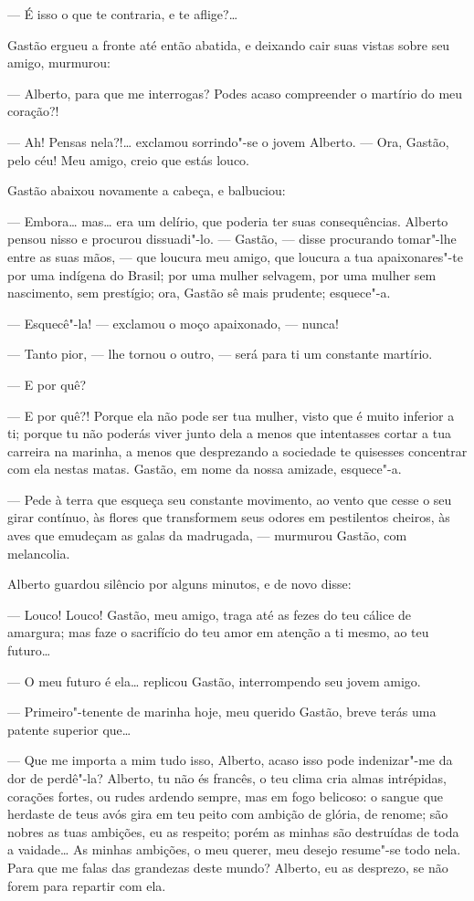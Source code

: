 --- É isso o que te contraria, e te aflige?\ldots{}

Gastão ergueu a fronte até então abatida, e deixando cair suas vistas
sobre seu amigo, murmurou:

--- Alberto, para que me interrogas? Podes acaso compreender o martírio
do meu coração?!

--- Ah! Pensas nela?!\ldots{} exclamou sorrindo"-se o jovem Alberto. --- Ora,
Gastão, pelo céu! Meu amigo, creio que estás louco.

Gastão abaixou novamente a cabeça, e balbuciou:

--- Embora\ldots{} mas\ldots{} era um delírio, que poderia ter suas consequências.
Alberto pensou nisso e procurou dissuadi"-lo. --- Gastão, --- disse procurando tomar"-lhe entre as suas mãos, --- que loucura meu amigo, que
loucura a tua apaixonares"-te por uma indígena do Brasil; por uma mulher
selvagem, por uma mulher sem nascimento, sem prestígio; ora, Gastão sê
mais prudente; esquece"-a.

--- Esquecê"-la! --- exclamou o moço apaixonado, --- nunca!

--- Tanto pior, --- lhe tornou o outro, --- será para ti um constante
martírio.

--- E por quê?

--- E por quê?! Porque ela não pode ser tua mulher, visto que é muito
inferior a ti; porque tu não poderás viver junto dela a menos que
intentasses cortar a tua carreira na marinha, a menos que desprezando a
sociedade te quisesses concentrar com ela nestas matas. Gastão, em nome
da nossa amizade, esquece"-a.

--- Pede à terra que esqueça seu constante movimento, ao vento que cesse
o seu girar contínuo, às flores que transformem seus odores em
pestilentos cheiros, às aves que emudeçam as galas da madrugada, ---
murmurou Gastão, com melancolia.

Alberto guardou silêncio por alguns minutos, e de novo disse:

--- Louco! Louco! Gastão, meu amigo, traga até as fezes do teu cálice de
amargura; mas faze o sacrifício do teu amor em atenção a ti mesmo, ao
teu futuro\ldots{}

--- O meu futuro é ela\ldots{} replicou Gastão, interrompendo seu jovem
amigo.

--- Primeiro"-tenente de marinha hoje, meu querido Gastão, breve terás
uma patente superior que\ldots{}

--- Que me importa a mim tudo isso, Alberto, acaso isso pode
indenizar"-me da dor de perdê"-la? Alberto, tu não és francês, o teu clima
cria almas intrépidas, corações fortes, ou rudes ardendo sempre, mas em
fogo belicoso: o sangue que herdaste de teus avós gira em teu peito com
ambição de glória, de renome; são nobres as tuas ambições, eu as
respeito; porém as minhas são destruídas de toda a vaidade\ldots{} As minhas
ambições, o meu querer, meu desejo resume"-se todo nela. Para que me
falas das grandezas deste mundo? Alberto, eu as desprezo, se não forem
para repartir com ela.

